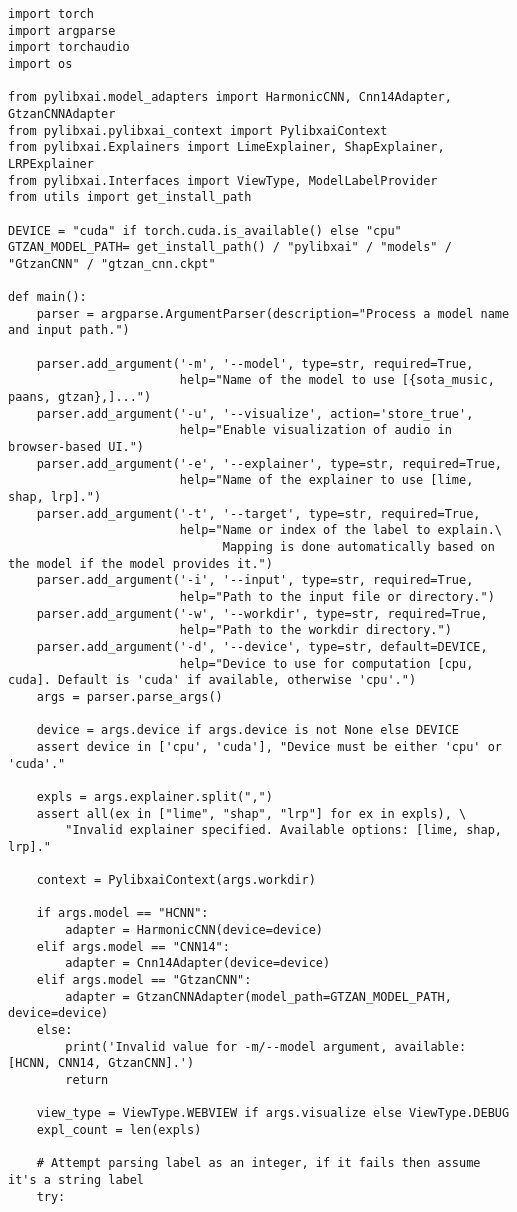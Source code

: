 \documentclass[
    bindingoffset=5mm,  %
    footnoteindent=3mm, %
    hyphenation=true    %
]{src/wut-thesis}
\begin{document}
\begin{verbatim}
import torch
import argparse
import torchaudio
import os

from pylibxai.model_adapters import HarmonicCNN, Cnn14Adapter, GtzanCNNAdapter
from pylibxai.pylibxai_context import PylibxaiContext
from pylibxai.Explainers import LimeExplainer, ShapExplainer, LRPExplainer
from pylibxai.Interfaces import ViewType, ModelLabelProvider
from utils import get_install_path

DEVICE = "cuda" if torch.cuda.is_available() else "cpu"
GTZAN_MODEL_PATH= get_install_path() / "pylibxai" / "models" / "GtzanCNN" / "gtzan_cnn.ckpt"

def main():
    parser = argparse.ArgumentParser(description="Process a model name and input path.")
    
    parser.add_argument('-m', '--model', type=str, required=True,
                        help="Name of the model to use [{sota_music, paans, gtzan},]...")
    parser.add_argument('-u', '--visualize', action='store_true',
                        help="Enable visualization of audio in browser-based UI.")
    parser.add_argument('-e', '--explainer', type=str, required=True,
                        help="Name of the explainer to use [lime, shap, lrp].")
    parser.add_argument('-t', '--target', type=str, required=True,
                        help="Name or index of the label to explain.\
                              Mapping is done automatically based on the model if the model provides it.") 
    parser.add_argument('-i', '--input', type=str, required=True,
                        help="Path to the input file or directory.") 
    parser.add_argument('-w', '--workdir', type=str, required=True,
                        help="Path to the workdir directory.")
    parser.add_argument('-d', '--device', type=str, default=DEVICE,
                        help="Device to use for computation [cpu, cuda]. Default is 'cuda' if available, otherwise 'cpu'.")
    args = parser.parse_args()
    
    device = args.device if args.device is not None else DEVICE
    assert device in ['cpu', 'cuda'], "Device must be either 'cpu' or 'cuda'."
    
    expls = args.explainer.split(",")
    assert all(ex in ["lime", "shap", "lrp"] for ex in expls), \
        "Invalid explainer specified. Available options: [lime, shap, lrp]."

    context = PylibxaiContext(args.workdir)

    if args.model == "HCNN":
        adapter = HarmonicCNN(device=device)
    elif args.model == "CNN14":
        adapter = Cnn14Adapter(device=device)
    elif args.model == "GtzanCNN":
        adapter = GtzanCNNAdapter(model_path=GTZAN_MODEL_PATH, device=device)
    else:
        print('Invalid value for -m/--model argument, available: [HCNN, CNN14, GtzanCNN].')
        return
    
    view_type = ViewType.WEBVIEW if args.visualize else ViewType.DEBUG
    expl_count = len(expls)

    # Attempt parsing label as an integer, if it fails then assume it's a string label
    try:
\end{verbatim}
\end{document}
